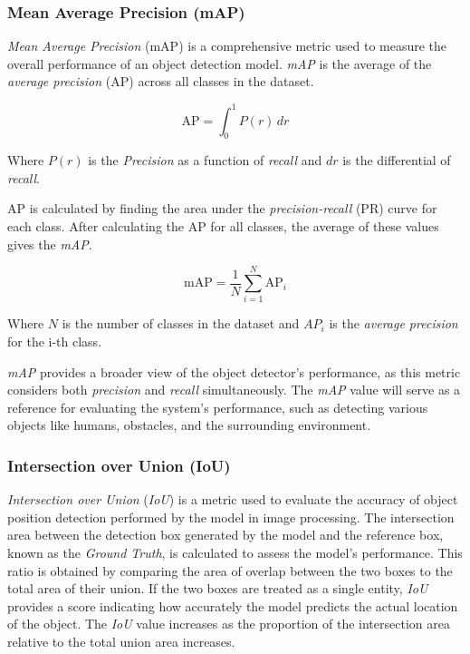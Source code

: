\vspace{5pt}
\subsubsection{Mean Average Precision (mAP)}
\label{subsubsec:mAP}

\emph{Mean Average Precision} (mAP) is a comprehensive metric used to measure the overall performance of an object detection model. \emph{mAP} is the average of the \emph{average precision} (AP) across all classes in the dataset.

\begin{equation}
  \mathrm{AP} = \int_0^1 P(r) \, dr
\end{equation}

Where \(P(r)\) is the \emph{Precision} as a function of \emph{recall} and \(dr\) is the differential of \emph{recall}.

AP is calculated by finding the area under the \emph{precision-recall} (PR) curve for each class. After calculating the AP for all classes, the average of these values gives the \emph{mAP}.

\begin{equation}
  \mathrm{mAP} = \frac{1}{N} \sum_{i=1}^{N} \mathrm{AP}_i
\end{equation}

Where \(N\) is the number of classes in the dataset and \(AP_i\) is the \emph{average precision} for the i-th class.

\emph{mAP} provides a broader view of the object detector's performance, as this metric considers both \emph{precision} and \emph{recall} simultaneously. The \emph{mAP} value will serve as a reference for evaluating the system's performance, such as detecting various objects like humans, obstacles, and the surrounding environment.

\vspace{5pt}
\subsubsection{Intersection over Union (IoU)}
\label{subsubsec:IoU}

\emph{Intersection over Union} (\emph{IoU}) is a metric used to evaluate the accuracy of object position detection performed by the model in image processing. The intersection area between the detection box generated by the model and the reference box, known as the \emph{Ground Truth}, is calculated to assess the model's performance. This ratio is obtained by comparing the area of overlap between the two boxes to the total area of their union. If the two boxes are treated as a single entity, \emph{IoU} provides a score indicating how accurately the model predicts the actual location of the object. The \emph{IoU} value increases as the proportion of the intersection area relative to the total union area increases.


